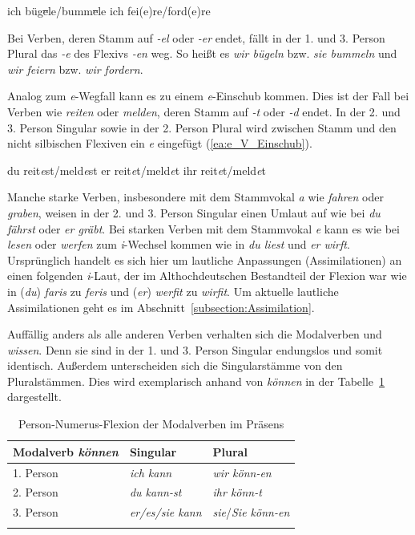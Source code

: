 \ea \label{ea:e_Wegfall_VStamm}
\ea \label{ea:bügle_bummle} ich büg\sout{e}le/bumm\sout{e}le
\ex \label{ex:feire_fordre} ich fei(e)re/ford(e)re
\z 
\z 

Bei Verben, deren Stamm auf \textit{-el} oder \textit{-er} endet, fällt in der 1. und 3. Person Plural das \textit{-e} des Flexivs \textit{-en} weg. So heißt es \textit{wir bügeln} bzw. \textit{sie bummeln} und \textit{wir feiern} bzw. \textit{wir fordern}. 

\largerpage
Analog zum \textit{e}-Wegfall kann es zu einem \textit{e}-Einschub kommen. Dies ist der Fall bei Verben wie \textit{reiten} oder \textit{melden}, deren Stamm auf \textit{-t} oder \textit{-d} endet. In der 2. und 3. Person Singular sowie in der 2. Person Plural wird zwischen Stamm und den nicht silbischen Flexiven ein \textit{e} eingefügt (\ref{ea:e_V_Einschub}).

\ea \label{ea:e_V_Einschub}
\ea \label{ea:reitest_meldest} du reit\textit{e}st/meld\textit{e}st
\ex \label{ex:er_reitet_meldet} er reit\textit{e}t/meld\textit{e}t
\ex \label{ex:ihr_reitet_meldet} ihr reit\textit{e}t/meld\textit{e}t
\z 
\z 

Manche starke Verben, insbesondere mit dem Stammvokal \textit{a} wie \textit{fahren} oder \textit{graben}, weisen in der 2. und 3. Person Singular einen Umlaut auf wie bei \textit{du fährst} oder \textit{er gräbt}. Bei starken Verben mit dem Stammvokal \textit{e} kann es wie bei \textit{lesen} oder \textit{werfen} zum \textit{i}-Wechsel kommen wie in \textit{du liest} und \textit{er wirft}. Ursprünglich handelt es sich hier um lautliche Anpassungen (Assimilationen) an einen folgenden \textit{i}-Laut, der im Althochdeutschen Bestandteil der Flexion war wie in (\textit{du}) \textit{faris} zu \textit{feris} und (\textit{er}) \textit{werfit} zu \textit{wirfit}. Um aktuelle lautliche Assimilationen geht es im Abschnitt~\ref{subsection:Assimilation}. 

Auffällig anders als alle anderen Verben verhalten sich die Modalverben und \textit{wissen}. Denn sie sind in der 1. und 3. Person Singular endungslos und somit identisch. Außerdem unterscheiden sich die Singularstämme von den Pluralstämmen. Dies wird exemplarisch anhand von \textit{können} in der Tabelle~\ref{tab:V_Pers_Num_Flexion_ModV} dargestellt. 

\begin{table}
  \centering
  \begin{tabular}{l l l}
    \lsptoprule
    Modalverb \textit{können} & Singular & Plural \\
    \hline
    1. Person & \textit{ich kann}  & \textit{wir könn-en} \\
    2. Person & \textit{du kann-st}  & \textit{ihr könn-t} \\
    3. Person & \textit{er/es/sie kann} & \textit{sie}/\textit{Sie könn-en} \\
    \lspbottomrule 
  \end{tabular}
  \caption{Person-Numerus-Flexion der Modalverben im Präsens}
  \label{tab:V_Pers_Num_Flexion_ModV}
\end{table}

